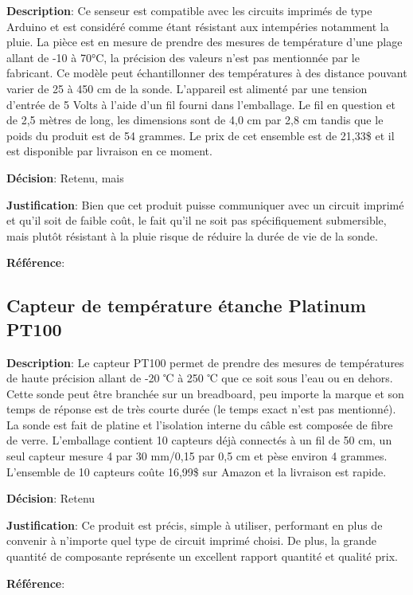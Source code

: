 \textbf{Description}:  Ce senseur est compatible avec les circuits imprimés de type Arduino et est considéré comme étant résistant aux intempéries notamment la pluie. La pièce est en mesure de prendre des mesures de température d’une plage allant de -10 à 70°C, la précision des valeurs n’est pas mentionnée par le fabricant. Ce modèle peut échantillonner des températures à des distance pouvant varier de 25 à 450 cm de la sonde. L’appareil est alimenté par une tension d’entrée de 5 Volts à l’aide d’un fil fourni dans l’emballage. Le fil en question et de 2,5 mètres de long, les dimensions sont de 4,0 cm par 2,8 cm tandis que le poids du produit est de 54 grammes. Le prix de cet ensemble est de 21,33\$ et il est disponible par livraison en ce moment. 

\textbf{Décision}: Retenu, mais

\textbf{Justification}: Bien que cet produit puisse communiquer avec un circuit imprimé et qu’il soit de faible coût, le fait qu’il ne soit pas spécifiquement submersible, mais plutôt résistant à la pluie risque de réduire la durée de vie de la sonde. 

\textbf{Référence}: \cite{dfrobot1}

\subsection{Capteur de température étanche Platinum PT100}


\textbf{Description}: Le capteur PT100 permet de prendre des mesures de températures de haute précision allant de -20 ℃ à 250 ℃ que ce soit sous l’eau ou en dehors. Cette sonde peut être branchée sur un breadboard, peu importe la marque et son temps de réponse est de très courte durée (le temps exact n’est pas mentionné). La sonde est fait de platine et l’isolation interne du câble est composée de fibre de verre. L’emballage contient 10 capteurs déjà connectés à un fil de 50 cm, un seul capteur mesure 4 par 30 mm/0,15 par 0,5 cm et pèse environ 4 grammes. L’ensemble de 10 capteurs coûte 16,99\$ sur Amazon et la livraison est rapide.

\textbf{Décision}: Retenu

\textbf{Justification}: Ce produit est précis, simple à utiliser, performant en plus de convenir à n’importe quel type de circuit imprimé choisi. De plus, la grande quantité de composante représente un excellent rapport quantité et qualité prix.

\textbf{Référence}: \cite{amazonPT100}




